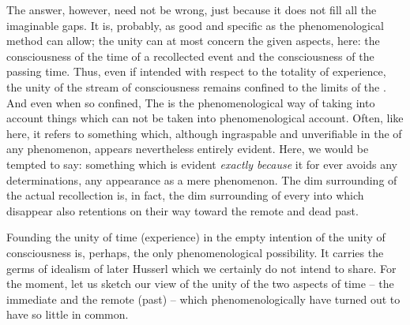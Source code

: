 The answer, however, need not be wrong, just because it does not fill all the
imaginable gaps. It is, probably, as good and specific as the phenomenological
method can allow; the unity can at most concern the  given aspects,
here: the  consciousness of the time of a recollected event and the
consciousness of the  passing time.  Thus, even if intended with
respect to the totality of experience, the unity of the stream of consciousness
remains confined to the limits of the \hoa. And even when so confined, 
The  is the phenomenological way of taking into account
things which can not be taken into phenomenological account. Often, like here,
it refers to something which, 
although ingraspable and unverifiable in the  of any phenomenon,
appears nevertheless entirely evident. Here, we would be tempted to say:
something which is evident {\em exactly because} it for ever avoids any 
determinations, any appearance as a mere phenomenon. The dim surrounding of the
actual recollection is, in fact, the dim surrounding of every 
into which disappear also retentions on their way toward the remote and dead past. 

\pa\label{pa:rest-flow} Founding the unity of time (experience) in the empty
intention of the unity 
of consciousness is, perhaps, the only phenomenological possibility. It carries
the germs of idealism of later Husserl which we certainly do not intend to
share. For the moment, let us sketch our view of the unity of the two aspects of
time -- the immediate and the remote (past) -- which phenomenologically have
turned out to have so little in common.


